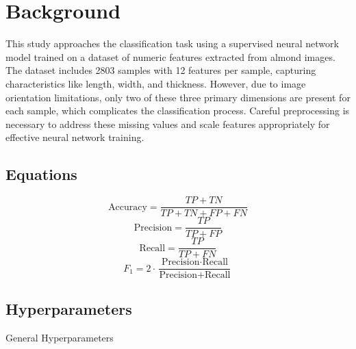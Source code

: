 \documentclass[conference]{IEEEtran}
\begin{document}
 
\section{Background}

This study approaches the classification task using a supervised neural network model trained on a dataset of numeric features extracted from almond images. The dataset includes 2803 samples with 12 features per sample, capturing characteristics like length, width, and thickness. However, due to image orientation limitations, only two of these three primary dimensions are present for each sample, which complicates the classification process. Careful preprocessing is necessary to address these missing values and scale features appropriately for effective neural network training.

\subsection{Equations}

\begin{equation}
\text{Accuracy} = \frac{TP + TN}{TP + TN + FP + FN}
\end{equation}
\begin{equation}
\text{Precision} = \frac{TP}{TP + FP}
\end{equation}
\begin{equation}
\text{Recall} = \frac{TP}{TP + FN}
\end{equation}
\begin{equation}
F_1 = 2 \cdot \frac{\text{Precision} \cdot \text{Recall}}{\text{Precision} + \text{Recall}}
\end{equation}

 
\subsection{Hyperparameters}

General Hyperparameters
\end{document}
